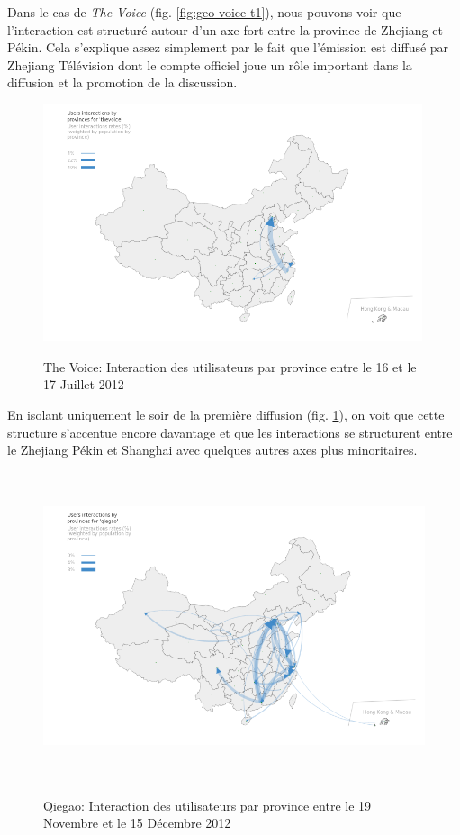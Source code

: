 Dans le cas de \textit{The Voice} (fig. \ref{fig:geo-voice-t1}), nous pouvons voir que
l{\textquoteright}interaction est structur\'e autour
d{\textquoteright}un axe fort entre la province de Zhejiang et P\'ekin.
Cela s{\textquoteright}explique assez simplement par le fait que
l{\textquoteright}\'emission est diffus\'e par Zhejiang T\'el\'evision
dont le compte officiel joue un r\^ole important dans la diffusion et
la promotion de la discussion.

\begin{figure}[H]
    \centering
    \includegraphics[width=4.3858in,height=2.7413in]{figures/chap4/chapitre4-img20.png}
    \label{fig:geo-voice-t2}
    
    \caption{
      The Voice: Interaction des utilisateurs par province entre le 16 et le 17 Juillet 2012
    }
\end{figure}

En isolant uniquement le soir de la premi\`ere diffusion (fig. \ref{fig:geo-voice-t2}), on voit que
cette structure s{\textquoteright}accentue encore davantage et que les
interactions se structurent entre le Zhejiang P\'ekin et Shanghai avec
quelques autres axes plus minoritaires.

\begin{figure}[H]
    \centering
    \includegraphics[width=5.7059in,height=3.5661in]{figures/chap4/chapitre4-img21.png}
    \label{fig:geo-qiegao-t0}
  \caption{
    Qiegao: Interaction des utilisateurs par province entre le 19 Novembre et le 15 D\'ecembre 2012
  }
\end{figure}


